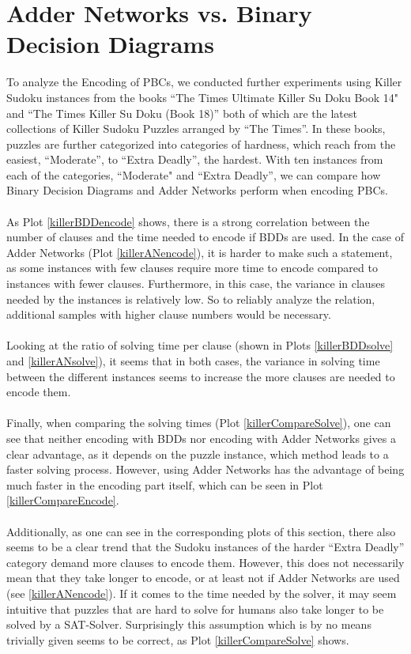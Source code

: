 \section{Adder Networks vs. Binary Decision Diagrams}
To analyze the Encoding of PBCs, we conducted further experiments using Killer Sudoku instances from the books ``The Times Ultimate Killer Su Doku Book 14"\cite{TheTimesUltimateKillerSuDokuBook14} and ``The Times Killer Su Doku (Book 18)''\cite{TheTimesKillerSuDokuBook18} both of which are the latest collections of Killer Sudoku Puzzles arranged by ``The Times''. In these books, puzzles are further categorized into categories of hardness, which reach from the easiest, ``Moderate'', to ``Extra Deadly'', the hardest. With ten instances from each of the categories, ``Moderate" and  ``Extra Deadly'', we can compare how Binary Decision Diagrams and Adder Networks perform when encoding PBCs.\\
\\
As Plot \ref{killerBDDencode} shows, there is a strong correlation between the number of clauses and the time needed to encode if BDDs are used. In the case of Adder Networks (Plot \ref{killerANencode}), it is harder to make such a statement, as some instances with few clauses require more time to encode compared to instances with fewer clauses. Furthermore, in this case, the variance in clauses needed by the instances is relatively low. So to reliably analyze the relation, additional samples with higher clause numbers would be necessary. \\
\\
Looking at the ratio of solving time per clause (shown in Plots \ref{killerBDDsolve} and \ref{killerANsolve}), it seems that in both cases, the variance in solving time between the different instances seems to increase the more clauses are needed to encode them.\\
\\
Finally, when comparing the solving times (Plot \ref{killerCompareSolve}), one can see that neither encoding with BDDs nor encoding with Adder Networks gives a clear advantage, as it depends on the puzzle instance, which method leads to a faster solving process. However, using Adder Networks has the advantage of being much faster in the encoding part itself, which can be seen in Plot \ref{killerCompareEncode}.\\
\\
Additionally, as one can see in the corresponding plots of this section, there also seems to be a clear trend that the Sudoku instances of the harder ``Extra Deadly'' category demand more clauses to encode them. However, this does not necessarily mean that they take longer to encode, or at least not if Adder Networks are used (see \ref{killerANencode}). If it comes to the time needed by the solver, it may seem intuitive that puzzles that are hard to solve for humans also take longer to be solved by a SAT-Solver. Surprisingly this assumption which is by no means trivially given seems to be correct, as Plot \ref{killerCompareSolve} shows. 

